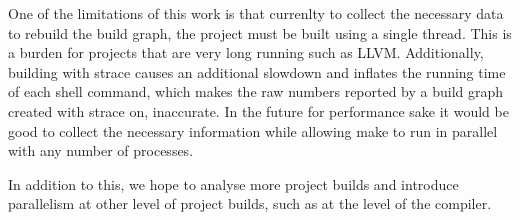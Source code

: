 \documentclass[sigplan,10pt,review,authorversion]{acmart}\settopmatter{printfolios=true,printccs=false,printacmref=false}
\begin{document}
One of the limitations of this work is that currenlty to collect the necessary data to rebuild
the build graph, the project must be built using a single thread.  This is a burden for projects
that are very long running such as LLVM.  Additionally, building with strace causes an additional
slowdown and inflates the running time of each shell command, which makes the raw numbers
reported by a build graph created with strace on, inaccurate.  In the future for performance sake
it would be good to collect the necessary information while allowing make to run in parallel with
any number of processes.

In addition to this, we hope to analyse more project builds and introduce parallelism at other
level of project builds, such as at the level of the compiler.  
\end{document}
